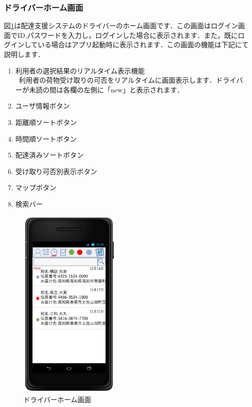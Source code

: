 \documentclass[a4j,titlepage]{jarticle}
\begin{document}
\subsubsection{ドライバーホーム画面}
図\ref{fig:driver_home}は配達支援システムのドライバーのホーム画面です．この画面はログイン画面でID,パスワードを入力し，ログインした場合に表示されます．また，既にログインしている場合はアプリ起動時に表示されます．この画面の機能は下記にて説明します．
\begin{enumerate}
	\item 利用者の選択結果のリアルタイム表示機能\\
	 \ 利用者の荷物受け取りの可否をリアルタイムに画面表示します．ドライバーが未読の間は各欄の左側に「new」と表示されます．
	\item ユーザ情報ボタン\\

	\item 距離順ソートボタン\\

	\item 時間順ソートボタン\\

	\item 配達済みソートボタン\\

	\item 受け取り可否別表示ボタン\\

	\item マップボタン\\

	\item 検索バー\\

\end{enumerate}

\begin{figure}[htbp]
 \begin{center}
  \includegraphics[width=50mm]{driver_home}
	\caption{ドライバーホーム画面}
	\label{fig:driver_home}
 \end{center}

\end{figure}
\end{document}
